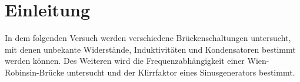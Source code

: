 \section{Einleitung}
\label{sec:einleitung}
In dem folgenden Versuch werden verschiedene Brückenschaltungen untersucht, mit denen unbekante Widerstände, Induktivitäten und 
Kondensatoren bestimmt werden können. Des Weiteren wird die Frequenzabhängigkeit einer Wien-Robinsin-Brücke untersucht und der 
Klirrfaktor eines Sinusgenerators bestimmt.